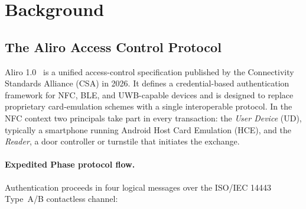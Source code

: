 \section{Background}
\label{sec:background}

\subsection{The Aliro Access Control Protocol}
\label{sec:aliro}

Aliro 1.0~\cite{CSA:Aliro10} is a unified access-control specification published by the
Connectivity Standards Alliance (CSA) in 2026.  It defines a credential-based
authentication framework for NFC, BLE, and UWB-capable devices and is designed
to replace proprietary card-emulation schemes with a single interoperable
protocol.  In the NFC context two principals take part in every transaction:
the \emph{User Device} (UD), typically a smartphone running Android Host Card
Emulation (HCE), and the \emph{Reader}, a door controller or turnstile that
initiates the exchange.

\paragraph{Expedited Phase protocol flow.}
Authentication proceeds in four logical messages over the ISO/IEC 14443 Type~A/B
contactless channel:

